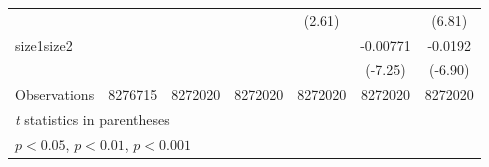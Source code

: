 {\begin{tabular}{l*{6}{c}}
                    &                     &                     &                     &      (2.61)         &                     &      (6.81)         \\
[1em]
size1size2          &                     &                     &                     &                     &    -0.00771\sym{***}&     -0.0192\sym{***}\\
                    &                     &                     &                     &                     &     (-7.25)         &     (-6.90)         \\
\hline
Observations        &     8276715         &     8272020         &     8272020         &     8272020         &     8272020         &     8272020         \\
\hline\hline
\multicolumn{7}{l}{\footnotesize \textit{t} statistics in parentheses}\\
\multicolumn{7}{l}{\footnotesize \sym{*} \(p<0.05\), \sym{**} \(p<0.01\), \sym{***} \(p<0.001\)}\\
\end{tabular}
}
